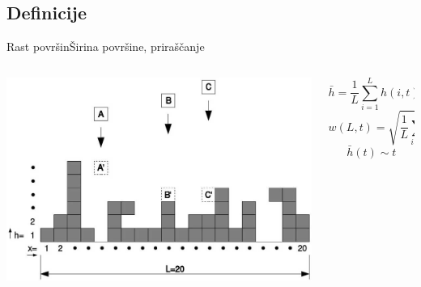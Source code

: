 \documentclass{beamer}
\begin{document}
\subsection{Definicije}

\begin{frame}{Rast površin}{Širina površine, priraščanje}
\begin{columns}
  \begin{column}{0.45\textwidth}
     \hspace*{-0.05\textwidth}\includegraphics[width=1.1\textwidth]{slike/bdep}
  \end{column}

  \begin{column}{0.55\textwidth}
    \footnotesize
    \begin{equation} \bar{h} = \frac{1}{L} \sum_{i=1}^L h(i,t) \end{equation}
    \newline
    \begin{equation} w(L,t) = \sqrt{\frac{1}{L} \sum_{i=1}^L (h(i,t)-\bar{h}(t))^2} \end{equation}
    \newline
    \begin{equation} \bar{h}(t) \sim t \end{equation}
  \end{column}
\end{columns}
\end{frame}
\end{document}
